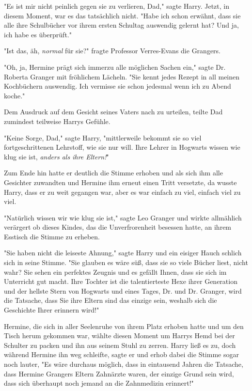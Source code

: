 {"Es ist mir nicht peinlich gegen sie zu verlieren, Dad," sagte Harry. Jetzt, in diesem Moment, war es das tatsächlich nicht. "Habe ich schon erwähnt, dass sie alle ihre Schulbücher vor ihrem ersten Schultag auswendig gelernt hat? Und ja, ich habe es überprüft."

"Ist das, äh, \emph{normal} für sie?" fragte Professor Verres-Evans die Grangers.

"Oh, ja, Hermine prägt sich immerzu alle möglichen Sachen ein," sagte Dr. Roberta Granger mit fröhlichem Lächeln. "Sie kennt jedes Rezept in all meinen Kochbüchern auswendig. Ich vermisse sie schon jedesmal wenn ich zu Abend koche."

Dem Ausdruck auf dem Gesicht seines Vaters nach zu urteilen, teilte Dad zumindest teilweise Harrys Gefühle.

"Keine Sorge, Dad," sagte Harry, "mittlerweile bekommt sie so viel fortgeschrittenen Lehrstoff, wie sie nur will. Ihre Lehrer in Hogwarts wissen wie klug sie ist, \emph{anders als ihre Eltern!}"

Zum Ende hin hatte er deutlich die Stimme erhoben und als sich ihm alle Gesichter zuwandten und Hermine ihm erneut einen Tritt versetzte, da wusste Harry, dass er zu weit gegangen war, aber es war einfach zu viel, einfach viel zu viel.

"Natürlich wissen wir wie klug sie ist," sagte Leo Granger und wirkte allmählich verärgert ob dieses Kindes, das die Unverfrorenheit besessen hatte, an ihrem Esstisch die Stimme zu erheben.

"Sie haben nicht die leiseste Ahnung," sagte Harry und ein eisiger Hauch schlich sich in seine Stimme. "Sie glauben es wäre süß, dass sie so viele Bücher liest, nicht wahr? Sie sehen ein perfektes Zeugnis und es gefällt Ihnen, dass sie sich im Unterricht gut macht. Ihre Tochter ist die talentierteste Hexe ihrer Generation und der hellste Stern von Hogwarts und eines Tages, Dr. und Dr. Granger, wird die Tatsache, dass Sie ihre Eltern sind das einzige sein, weshalb sich die Geschichte Ihrer erinnern wird!"

Hermine, die sich in aller Seelenruhe von ihrem Platz erhoben hatte und um den Tisch herum gekommen war, wählte diesen Moment um Harrys Hemd bei der Schulter zu packen und ihn aus seinem Stuhl zu zerren. Harry ließ es zu, doch während Hermine ihn weg schleifte, sagte er und erhob dabei die Stimme sogar noch lauter, "Es wäre durchaus möglich, dass in eintausend Jahren die Tatsache, dass Hermine Grangers Eltern Zahnärzte waren, der einzige Grund sein wird, dass sich überhaupt noch jemand an die Zahnmedizin erinnert!"

}

